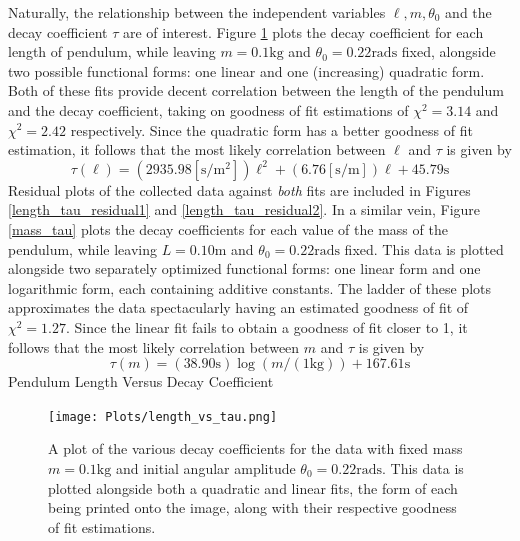 Naturally, the relationship between the independent variables $\ell, m, \theta_0$ and the decay coefficient $\tau$ are of interest. Figure \ref{length_tau} plots the decay coefficient for each length of pendulum, while leaving $m = 0.1\text{kg}$ and $\theta_0 = 0.22\text{rads}$ fixed, alongside two possible functional forms: one linear and one (increasing) quadratic form. Both of these fits provide decent correlation between the length of the pendulum and the decay coefficient, taking on goodness of fit estimations of $\chi^2 = 3.14$ and $\chi^2 = 2.42$ respectively. Since the quadratic form has a better goodness of fit estimation, it follows that the most likely correlation between $\ell$ and $\tau$ is given by
\begin{equation} \label{eq: length_vs_tau}
    \tau(\ell) = \left(2935.98 [\text{s}/\text{m}^2]\right) \ell^2 + \left(6.76 [\text{s}/\text{m}]\right)\ell + 45.79\text{s}
\end{equation}
 Residual plots of the collected data against \emph{both} fits are included in Figures \ref{length_tau_residual1} and \ref{length_tau_residual2}. In a similar vein, Figure \ref{mass_tau} plots the decay coefficients for each value of the mass of the pendulum, while leaving $L = 0.10\text{m}$ and $\theta_0 = 0.22\text{rads}$ fixed. This data is plotted alongside two separately optimized functional forms: one linear form and one logarithmic form, each containing additive constants. The ladder of these plots approximates the data spectacularly having an estimated goodness of fit of $\chi^2 = 1.27$. Since the linear fit fails to obtain a goodness of fit closer to 1, it follows that the most likely correlation between $m$ and $\tau$ is given by
 \begin{equation}\label{eq: mass_vs_tau}
     \tau(m) = \left(38.90\text{s}\right)\log(m/(1\text{kg})) + 167.61\text{s}
 \end{equation}
 \vspace{-0.75cm}
\centering\quad Pendulum Length Versus Decay Coefficient\flushleft
\begin{figure}[H]
    \centerline{\texttt{[image: Plots/length\_vs\_tau.png]}}
    \caption{\small{A plot of the various decay coefficients for the data with fixed mass $m = 0.1\text{kg}$ and initial angular amplitude $\theta_0 = 0.22\text{rads}$. This data is plotted alongside both a quadratic and linear fits, the form of each being printed onto the image, along with their respective goodness of fit estimations.}}
    \label{length_tau}
\end{figure}


